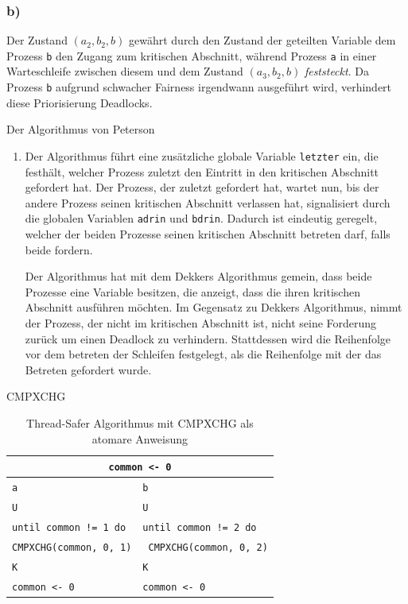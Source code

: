 \documentclass[a4paper,twoside,12pt,fleqn]{article}
\newcounter{AUFGNR}
\newcommand{\AUFGABE}[2]{\vspace{0.3cm}\item[Aufgabe~\arabic{AUFGNR}]\stepcounter{AUFGNR} #1\hfill\emph{#2}}
\begin{document}
\begin{description}
\subsubsection*{b)}
Der Zustand $(a_2, b_2, b)$ gewährt durch den Zustand der geteilten Variable dem Prozess \texttt{b} den Zugang zum kritischen Abschnitt, während Prozess \texttt{a} in einer Warteschleife zwischen diesem und dem Zustand $(a_3, b_2, b)$ \textit{feststeckt}. Da Prozess \texttt{b} aufgrund schwacher Fairness irgendwann ausgeführt wird, verhindert diese Priorisierung Deadlocks. 

\AUFGABE{Der Algorithmus von Peterson}{}
\begin{enumerate}
\item Der Algorithmus führt eine zusätzliche globale Variable \texttt{letzter} ein, die festhält, welcher Prozess zuletzt den Eintritt in den kritischen Abschnitt gefordert hat. Der Prozess, der zuletzt gefordert hat, wartet nun, bis der andere Prozess seinen kritischen Abschnitt verlassen hat, signalisiert durch die globalen Variablen \texttt{adrin} und \texttt{bdrin}. Dadurch ist eindeutig geregelt, welcher der beiden Prozesse seinen kritischen Abschnitt betreten darf, falls beide fordern. 

Der Algorithmus hat mit dem Dekkers Algorithmus gemein, dass beide Prozesse eine Variable besitzen, die anzeigt, dass die ihren kritischen Abschnitt ausführen möchten. Im Gegensatz zu Dekkers Algorithmus, nimmt der Prozess, der nicht im kritischen Abschnitt ist, nicht seine Forderung zurück um einen Deadlock zu verhindern. Stattdessen wird die Reihenfolge vor dem betreten der Schleifen festgelegt, als die Reihenfolge mit der das Betreten gefordert wurde.
\end{enumerate}

\AUFGABE{CMPXCHG}{}
\begin{table}[h]
\centering
\begin{tabularx}{0.75\textwidth}{l | l}
\multicolumn{2}{c}{\texttt{common <- 0}}\\
\hline
\texttt{a} & \texttt{b}\\
\hline
\texttt{U} & \texttt{U} \\
\texttt{until common != 1 do} & \texttt{until common != 2 do} \\
\texttt{\hspace{2em}CMPXCHG(common, 0, 1)} & \texttt{\hspace{2em} CMPXCHG(common, 0, 2)} \\
\texttt{K} & \texttt{K} \\
\texttt{common <- 0} & \texttt{common <- 0}\\
\end{tabularx}
\caption{Thread-Safer Algorithmus mit CMPXCHG als atomare Anweisung}
\end{table}


\end{description}
\end{document}
